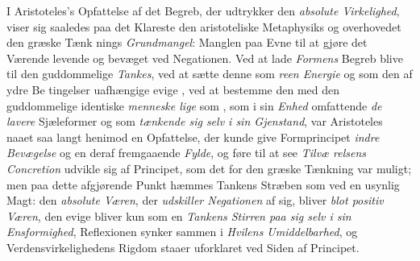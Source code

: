 I Aristoteles's Opfattelse af det Begreb, der udtrykker den
\emph{absolute Virkelighed}, viser sig saaledes paa det Klareste
den aristoteliske Metaphysiks og overhovedet den græske Tænk\-%
nings \emph{Grundmangel}: Manglen paa Evne til at gjøre det
Værende levende og bevæget ved Negationen. Ved at lade
\emph{Formens} Begreb blive til den guddommelige \emph{Tankes}, ved
 at sætte denne som \emph{reen Energie} og som den af ydre Be\-%
tingelser uafhængige evige \emph{}, ved at
bestemme den med den guddommelige identiske \emph{menneske\-%
lige}  som \emph{}, som i sin \emph{Enhed} omfattende
\emph{de lavere} Sjæleformer og som \emph{tænkende sig selv i sin
Gjenstand}, var Aristoteles naaet saa langt henimod en
Opfattelse, der kunde give Formprincipet \emph{indre Bevægelse}
og en deraf fremgaaende \emph{Fylde}, og føre til at see \emph{Tilvæ\-%
relsens Concretion} udvikle sig af Principet, som det for
den græske Tænkning var muligt; men paa dette afgjørende
Punkt hæmmes Tankens Stræben som ved en usynlig Magt:
den \emph{absolute Væren}, der \emph{udskiller Negationen} af sig,
bliver \emph{blot positiv Væren}, den evige 
bliver kun som en \emph{Tankens Stirren paa sig selv i sin
Ensformighed}, Reflexionen synker sammen i \emph{Hvilens
Umiddelbarhed}, og Verdensvirkelighedens Rigdom staaer
uforklaret ved Siden af Principet.

\divrule

